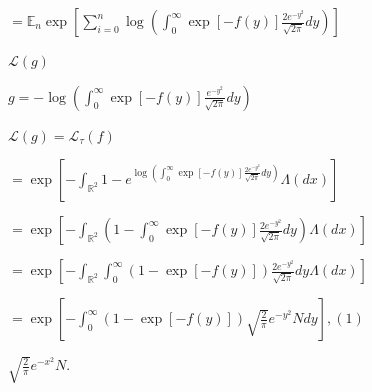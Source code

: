 \documentclass{article}
\def\lthtmlcheckvsize{\ifdim\ht\sizebox<\vsize 
  \ifdim\wd\sizebox<\hsize\expandafter\hfill\fi \expandafter\vfill
  \else\expandafter\vss\fi}%
\begin{document}
{\newpage\clearpage
{}%
$\displaystyle = \mathbb{E}_n \exp \left[ \sum_{i= 0}^n \log \left(   \int_{0}^{\infty}  \exp \left[  -f(y)  \right] \frac{2e^{-y^2}}{\sqrt{2 \pi}} dy \right) \right]$%
\lthtmlindisplaymathZ
\lthtmlcheckvsize\clearpage}

{\newpage\clearpage
{}%
$ \mathcal{L}(g)$%
\lthtmlindisplaymathZ
\lthtmlcheckvsize\clearpage}

{\newpage\clearpage
{}%
$ g = - \log \left(   \int_{0}^{\infty}  \exp \left[  -f(y)  \right] \frac{e^{-y^2}}{\sqrt{2 \pi}} dy \right)  $%
\lthtmlindisplaymathZ
\lthtmlcheckvsize\clearpage}

{\newpage\clearpage
{}%
$\displaystyle \mathcal{L}(g) = \mathcal{L}_{\tau}(f)$%
\lthtmlindisplaymathZ
\lthtmlcheckvsize\clearpage}

{\newpage\clearpage
{}%
$\displaystyle = \exp \left[  -\int_{\mathbb{R}^2} 1 -  e^{\log \left(   \int_{0}^{\infty}  \exp \left[  -f(y)   \right] \frac{2e^{-y^2}}{\sqrt{2 \pi}} dy \right) }\Lambda(dx) \right]$%
\lthtmlindisplaymathZ
\lthtmlcheckvsize\clearpage}

{\newpage\clearpage
{}%
$\displaystyle = \exp \left[-\int_{\mathbb{R}^2} \left(1  -   \int_{0}^{\infty}  \exp [-f(y)] \frac{2e^{-y^2}}{\sqrt{2 \pi}}  dy \right)  \Lambda(dx)  \right]$%
\lthtmlindisplaymathZ
\lthtmlcheckvsize\clearpage}

{\newpage\clearpage
{}%
$\displaystyle = \exp \left[-\int_{\mathbb{R}^2}\int_{0}^{\infty} \left(1  -     \exp [-f(y)]   \right) \frac{2e^{-y^2}}{\sqrt{2 \pi}}dy  \Lambda(dx)  \right]$%
\lthtmlindisplaymathZ
\lthtmlcheckvsize\clearpage}

{\newpage\clearpage
{}%
$\displaystyle = \exp \left[-\int_{0}^{\infty} \left(1  -     \exp [-f(y)]   \right)  \sqrt{\frac{2}{\pi}}e^{-y^2} N dy    \right], (1)$%
\lthtmlindisplaymathZ
\lthtmlcheckvsize\clearpage}

{\newpage\clearpage
{}%
$ \sqrt{\frac{2}{\pi}}e^{-x^2} N.$%
\lthtmlindisplaymathZ
\lthtmlcheckvsize\clearpage}
\end{document}
